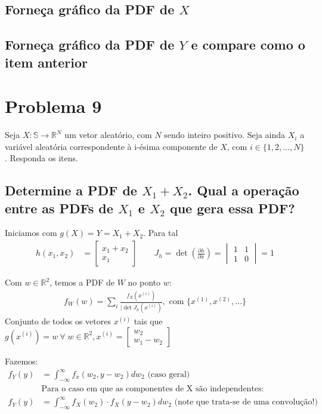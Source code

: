 \documentclass{article}
\begin{document}
\subsection{Forneça gráfico da PDF de $X$}
\subsection{Forneça gráfico da PDF de $Y$ e compare como o item anterior}

\section{Problema 9}
Seja $X: \mathbb{S} \to \mathbb{R}^N$ um vetor aleatório, com $N$ sendo inteiro positivo. Seja ainda
$X_i$ a variável aleatória correspondente à i-ésima componente de $X$, com $i \in \{1,2,\ldots,N\}$.
Responda os itens.

\subsection{Determine a PDF de $X_1 + X_2$. Qual a operação entre as PDFs de $X_1$ e $X_2$ que gera
essa PDF?}
Iniciamos com $g(X) = Y = X_1 + X_2$. Para tal
\begin{align*}
    h(x_1,x_2) &= \begin{bmatrix} x_1+x_2\\x_1 \end{bmatrix}
    \qquad J_h = \det{\left(\frac{\partial h}{\partial x}\right)} = \begin{vmatrix} 1&1\\1&0 \end{vmatrix} = 1
\end{align*}

Com $w \in \mathbb{R}^2$, temos a PDF de $W$ no ponto $w$:
\begin{align*}
f_W(w) = \sum_i \frac{f_X(x^{(i)})}{|\det{J_h(x^{(i)})}}, \text{ com } \{x^{(1)},x^{(2)},\ldots\}
\end{align*}
Conjunto de todos os vetores $x^{(i)}$ tais que $g(x^{(i)}) = w \ \forall \; w \in \mathbb{R}^2,
x^{(i)} = \begin{bmatrix} w_2 \\ w_1-w_2 \end{bmatrix} $

Fazemos:
\begin{align*}
    f_Y(y) &= \int_{-\infty}^{\infty} f_x(w_2, y - w_2) d{w_2} \text{ (caso geral)} \\
    &\text{Para o caso em que as componentes de X são independentes:} \\
    f_Y(y) &= \int_{-\infty}^{\infty} f_X(w_2) \cdot f_X(y-w_2) d{w_2} \text{ (note que trata-se de uma convolução!)}
\end{align*}
\end{document}
